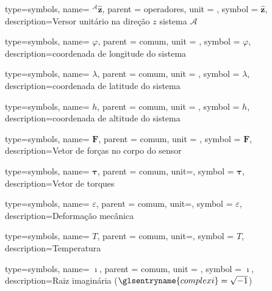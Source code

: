 {type=symbols,
  name= \ensuremath{{}^{\scriptscriptstyle{\mathcal{A}}}\hat{\boldsymbol{z}}},
  parent = {operadores},
  unit = \unexpanded{},
  symbol = \ensuremath{\hat{\boldsymbol{z}}},
  description={Versor unitário na direção \ensuremath{z} sistema \ensuremath{\mathcal{A}}}
}

{type=symbols,
  name= \ensuremath{\varphi},
  parent = {comum},
  unit = \unexpanded{\degree},
  symbol = \ensuremath{\varphi},
  description={coordenada de longitude do sistema }
}

{type=symbols,
  name= \ensuremath{\lambda},
  parent = {comum},
  unit = \unexpanded{\degree},
  symbol = \ensuremath{\lambda},
  description={coordenada de latitude do sistema }
}

{type=symbols,
  name= \ensuremath{h},
  parent = {comum},
  unit = \unexpanded{\si{\meter}},
  symbol = \ensuremath{h},
  description={coordenada de altitude do sistema }
}

{type=symbols,
  name= \ensuremath{\mathbf{F}},
  parent = {comum},
  unit = \unexpanded{\si{\newton}},
  symbol = \ensuremath{\mathbf{F}},
  description={Vetor de forças no corpo do sensor}
}

{type=symbols,
  name= \ensuremath{\boldsymbol{\tau}},
  parent = {comum},
  unit=\unexpanded{\si{\newton\meter}},
  symbol = \ensuremath{\boldsymbol{\tau}},
  description={Vetor de torques}
}

{type=symbols,
  name= \ensuremath{\varepsilon},
  parent = {comum},
  unit=\unexpanded{},
  symbol = \ensuremath{\varepsilon},
  description={Deformação mecânica}
}

{type=symbols,
  name= \ensuremath{T},
  parent = {comum},
  unit=\unexpanded{\unit{\celsius}},
  symbol = \ensuremath{T},
  description={Temperatura}
}




{type=symbols,
  name= \ensuremath{\imath},
  parent = {comum},
  unit = \unexpanded{},
  symbol = \ensuremath{\imath},
  description={Raiz imaginária ($\glsentryname{complexi} = \sqrt{-1}$)}
}
